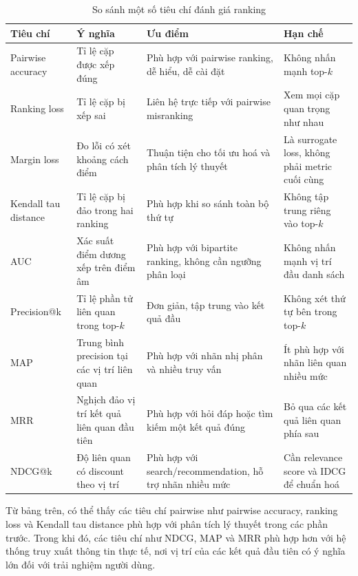 \begin{table}[H]
\centering
\caption{So sánh một số tiêu chí đánh giá ranking}
\label{tab:ranking-metrics-comparison}
\begin{tabular}{p{3.2cm}p{4.2cm}p{4.2cm}p{3.2cm}}
\toprule
\textbf{Tiêu chí} & \textbf{Ý nghĩa} & \textbf{Ưu điểm} & \textbf{Hạn chế} \\
\midrule
Pairwise accuracy &
Tỉ lệ cặp được xếp đúng &
Phù hợp với pairwise ranking, dễ hiểu, dễ cài đặt &
Không nhấn mạnh top-\(k\) \\
\midrule
Ranking loss &
Tỉ lệ cặp bị xếp sai &
Liên hệ trực tiếp với pairwise misranking &
Xem mọi cặp quan trọng như nhau \\
\midrule
Margin loss &
Đo lỗi có xét khoảng cách điểm &
Thuận tiện cho tối ưu hoá và phân tích lý thuyết &
Là surrogate loss, không phải metric cuối cùng \\
\midrule
Kendall tau distance &
Tỉ lệ cặp bị đảo trong hai ranking &
Phù hợp khi so sánh toàn bộ thứ tự &
Không tập trung riêng vào top-\(k\) \\
\midrule
AUC &
Xác suất điểm dương xếp trên điểm âm &
Phù hợp với bipartite ranking, không cần ngưỡng phân loại &
Không nhấn mạnh vị trí đầu danh sách \\
\midrule
Precision@k &
Tỉ lệ phần tử liên quan trong top-\(k\) &
Đơn giản, tập trung vào kết quả đầu &
Không xét thứ tự bên trong top-\(k\) \\
\midrule
MAP &
Trung bình precision tại các vị trí liên quan &
Phù hợp với nhãn nhị phân và nhiều truy vấn &
Ít phù hợp với nhãn liên quan nhiều mức \\
\midrule
MRR &
Nghịch đảo vị trí kết quả liên quan đầu tiên &
Phù hợp với hỏi đáp hoặc tìm kiếm một kết quả đúng &
Bỏ qua các kết quả liên quan phía sau \\
\midrule
NDCG@k &
Độ liên quan có discount theo vị trí &
Phù hợp với search/recommendation, hỗ trợ nhãn nhiều mức &
Cần relevance score và IDCG để chuẩn hoá \\
\bottomrule
\end{tabular}
\end{table}

Từ bảng trên, có thể thấy các tiêu chí pairwise như pairwise accuracy, ranking loss và Kendall tau distance phù hợp với phân tích lý thuyết trong các phần trước. Trong khi đó, các tiêu chí như NDCG, MAP và MRR phù hợp hơn với hệ thống truy xuất thông tin thực tế, nơi vị trí của các kết quả đầu tiên có ý nghĩa lớn đối với trải nghiệm người dùng.

